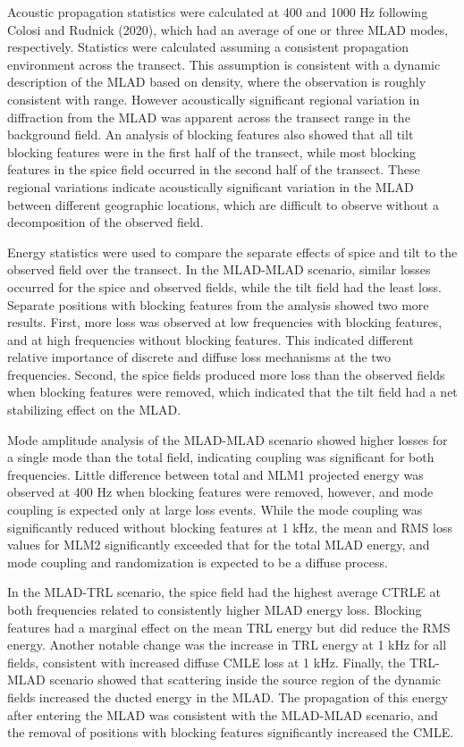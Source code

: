 \documentclass[preprint,NumberedRefs]{JASA}
\begin{document}
Acoustic propagation statistics were calculated at 400 and 1000 Hz following Colosi and Rudnick (2020),\cite{colosi2020observations} which had an average of one or three MLAD modes, respectively. Statistics were calculated assuming a consistent propagation environment across the transect. This assumption is consistent with a dynamic description of the MLAD based on density,\citep{cole2010seasonal} where the observation is roughly consistent with range. However acoustically significant regional variation in diffraction from the MLAD was apparent across the transect range in the background field. An analysis of blocking features also showed that all tilt blocking features were in the first half of the transect, while most blocking features in the spice field occurred in the second half of the transect. These regional variations indicate acoustically significant variation in the MLAD between different geographic locations, which are difficult to observe without a decomposition of the observed field.

Energy statistics were used to compare the separate effects of spice and tilt to the observed field over the transect. In the MLAD-MLAD scenario, similar losses occurred for the spice and observed fields, while the tilt field had the least loss. Separate positions with blocking features from the analysis showed two more results. First, more loss was observed at low frequencies with blocking features, and at high frequencies without blocking features. This indicated different relative importance of discrete and diffuse loss mechanisms at the two frequencies. Second, the spice fields produced more loss than the observed fields when blocking features were removed, which indicated that the tilt field had a net stabilizing effect on the MLAD.

Mode amplitude analysis of the MLAD-MLAD scenario showed higher losses for a single mode than the total field, indicating coupling was significant for both frequencies. Little difference between total and MLM1 projected energy was observed at 400 Hz when blocking features were removed, however, and mode coupling is expected only at large loss events. While the mode coupling was significantly reduced without blocking features at 1 kHz, the mean and RMS loss values for MLM2 significantly exceeded that for the total MLAD energy, and mode coupling and randomization is expected to be a diffuse process.

In the MLAD-TRL scenario, the spice field had the highest average CTRLE at both frequencies related to consistently higher MLAD energy loss. Blocking features had a marginal effect on the mean TRL energy but did reduce the RMS energy. Another notable change was the increase in TRL energy at 1 kHz for all fields, consistent with increased diffuse CMLE loss at 1 kHz. Finally, the TRL-MLAD scenario showed that scattering inside the source region of the dynamic fields increased the ducted energy in the MLAD. The propagation of this energy after entering the MLAD was consistent with the MLAD-MLAD scenario, and the removal of positions with blocking features significantly increased the CMLE.
\end{document}
